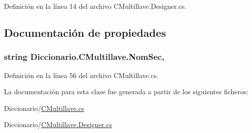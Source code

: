 Definición en la línea 14 del archivo C\-Multillave.\-Designer.\-cs.



\subsection{Documentación de propiedades}
\hypertarget{class_diccionario_1_1_c_multillave_af79a9ae500eaaf6c7f591dc839a5b223}{
\subsubsection[{Nom\-Sec}]{\setlength{\rightskip}{0pt plus 5cm}string Diccionario.\-C\-Multillave.\-Nom\-Sec\hspace{0.3cm}{\ttfamily [get]}, {\ttfamily [set]}}}\label{class_diccionario_1_1_c_multillave_af79a9ae500eaaf6c7f591dc839a5b223}


Definición en la línea 56 del archivo C\-Multillave.\-cs.



La documentación para esta clase fue generada a partir de los siguientes ficheros\-:\begin{DoxyCompactItemize}
\item 
Diccionario/\hyperlink{_c_multillave_8cs}{C\-Multillave.\-cs}\item 
Diccionario/\hyperlink{_c_multillave_8_designer_8cs}{C\-Multillave.\-Designer.\-cs}\end{DoxyCompactItemize}
